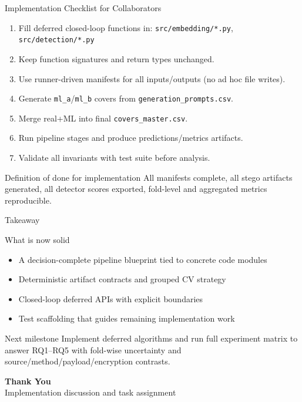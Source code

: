 \documentclass[aspectratio=169,11pt]{beamer}
\begin{document}
\begin{frame}{Implementation Checklist for Collaborators}
\small
\begin{enumerate}
\item Fill deferred closed-loop functions in:
\texttt{src/embedding/*.py}, \texttt{src/detection/*.py}
\item Keep function signatures and return types unchanged.
\item Use runner-driven manifests for all inputs/outputs (no ad hoc file writes).
\item Generate \texttt{ml\_a}/\texttt{ml\_b} covers from \texttt{generation\_prompts.csv}.
\item Merge real+ML into final \texttt{covers\_master.csv}.
\item Run pipeline stages and produce predictions/metrics artifacts.
\item Validate all invariants with test suite before analysis.
\end{enumerate}

\begin{alertblock}{Definition of done for implementation}
All manifests complete, all stego artifacts generated, all detector scores exported, fold-level and aggregated metrics reproducible.
\end{alertblock}
\end{frame}

\begin{frame}{Takeaway}
\small
\begin{block}{What is now solid}
\begin{itemize}
\item A decision-complete pipeline blueprint tied to concrete code modules
\item Deterministic artifact contracts and grouped CV strategy
\item Closed-loop deferred APIs with explicit boundaries
\item Test scaffolding that guides remaining implementation work
\end{itemize}
\end{block}

\begin{exampleblock}{Next milestone}
Implement deferred algorithms and run full experiment matrix to answer RQ1--RQ5 with fold-wise uncertainty and source/method/payload/encryption contrasts.
\end{exampleblock}
\end{frame}

\begin{frame}[plain]
\vfill
\begin{center}
{\Large\bfseries\color{umdark}Thank You}\\[8pt]
{\normalsize\color{umgray}Implementation discussion and task assignment}
\end{center}
\vfill
\end{frame}
\end{document}
